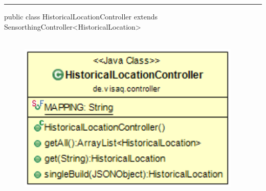 \rule{\textwidth}{0.4pt}
public class HistoricalLocationController extends SensorthingController<HistoricalLocation>
\\\\
\begin{minipage}{0.4\textwidth}
    \begin{figure}[H]
        {\centering\includegraphics[width=0.95\textwidth]{media/backend/controller/classes/HistoricalLocationController.png}}
    \end{figure}
    \end{minipage} \hfill
\begin{minipage}{0.6\textwidth}
\end{minipage}

